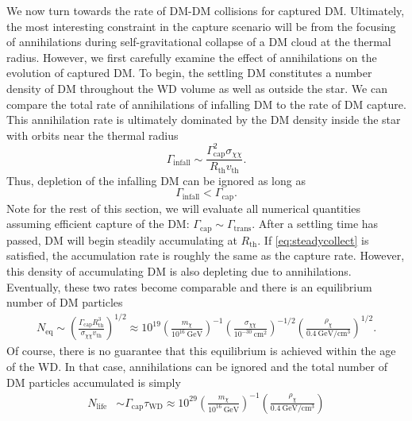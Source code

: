 \documentclass[preprintnumbers,amsmath,amssymb,prd,superscriptaddress]{revtex4}
\newcommand{\GeV}{\text{GeV}}
\newcommand{\cm}{\text{cm}}
\def\r{\right)}
\def\l{\left(}
\begin{document}
We now turn towards the rate of DM-DM collisions for captured DM. 
Ultimately, the most interesting constraint in the capture scenario will be from the focusing of annihilations during self-gravitational collapse of a DM cloud at the thermal radius.
However, we first carefully examine the effect of annihilations on the evolution of captured DM. 
To begin, the settling DM constitutes a number density of DM throughout the WD volume as well as outside the star. 
We can compare the total rate of annihilations of infalling DM to the rate of DM capture.  
This annihilation rate is ultimately dominated by the DM density inside the star with orbits near the thermal radius
\begin{equation}
\label{eq:infallrate}
\Gamma_\text{infall} \sim \frac{\Gamma_\text{cap}^2 \sigma_{\chi \chi}}{R_\text{th} v_\text{th}}.
\end{equation}
Thus, depletion of the infalling DM can be ignored as long as
\begin{equation}
\label{eq:steadycollect}
\Gamma_\text{infall} < \Gamma_\text{cap}.
\end{equation}
Note for the rest of this section, we will evaluate all numerical quantities assuming efficient capture of the DM: $\Gamma_\text{cap} \sim \Gamma_\text{trans}$. 
After a settling time has passed, DM will begin steadily accumulating at $R_\text{th}$.
If \eqref{eq:steadycollect} is satisfied, the accumulation rate is roughly the same as the capture rate. 
However, this density of accumulating DM is also depleting due to annihilations. 
Eventually, these two rates become comparable and there is an equilibrium number of DM particles
\begin{align}
N_\text{eq} \sim \l \frac{\Gamma_\text{cap} R_\text{th}^3}{\sigma_{\chi \chi} v_\text{th}} \r^{1/2} \approx 10^{19} \l \frac{m_\chi}{10^{16} ~\GeV} \r^{-1} \l \frac{\sigma_{\chi \chi}}{10^{-30} ~\cm^2} \r^{-1/2} \l \frac{\rho_\chi}{0.4 ~\GeV/\cm^3} \r^{1/2}.
\end{align}
Of course, there is no guarantee that this equilibrium is achieved within the age of the WD. 
In that case, annihilations can be ignored and the total number of DM particles accumulated is simply
\begin{align}
N_\text{life} &\sim \Gamma_\text{cap} \tau_\text{WD} \approx 10^{29}  \l \frac{m_\chi}{10^{16} ~\GeV} \r^{-1} \l \frac{\rho_\chi}{0.4 ~\GeV/\cm^3} \r
\end{align}
\end{document}
